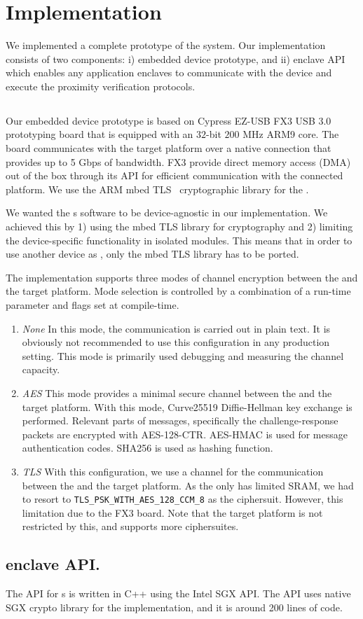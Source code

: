 \section{Implementation}
\label{sec:implementation}

We implemented a complete prototype of the \name system. Our implementation consists of two components: i) \device embedded device prototype, and ii) \name enclave API which enables any application enclaves to communicate with the \device device and execute the proximity verification protocols.


\subsection{\device} 

Our embedded device prototype is based on Cypress EZ-USB FX3 USB 3.0 prototyping board that is equipped with an $32$-bit $200$ MHz ARM9 core. The board communicates with the target platform over a native  connection that provides up to 5 Gbps of bandwidth. FX3 provide direct memory access (DMA) out of the box through its API for efficient communication with the connected platform. We use the ARM mbed TLS~\cite{mbed} cryptographic library for the \tls.

 We wanted the \device{}s software to be device-agnostic in our implementation. We achieved this by 1) using the mbed TLS library for cryptography and 2) limiting the device-specific functionality in isolated modules. This means that in order to use another device as \device, only the mbed TLS library has to be ported.

 The implementation supports three modes of channel encryption between the \device and the target platform. Mode selection is controlled by a combination of a run-time parameter and flags set at compile-time.

\begin{enumerate}
  \item \emph{None} In this mode, the communication is carried out in plain text. It is obviously not recommended to use this configuration in any production setting. This mode is primarily used debugging and measuring the channel capacity.
  \item \emph{AES} This mode provides a minimal secure channel between the \device and the target platform. With this mode, Curve25519 Diffie-Hellman key exchange is performed. Relevant parts of messages, specifically the challenge-response packets are encrypted with AES-128-CTR. AES-HMAC is used for message authentication codes. SHA256 is used as hashing function.
  \item \emph{TLS} With this configuration, we use a \tls channel for the communication between the \device and the target platform. As the \device only has limited SRAM, we had to resort to \texttt{TLS\_PSK\_WITH\_AES\_128\_CCM\_8} as the ciphersuit. However, this limitation due to the FX3 board. Note that the target platform is not restricted by this, and supports more ciphersuites. 
\end{enumerate}



\subsection{\name enclave API.} 
The \name API for \app{}s is written in C++ using the Intel SGX API. The API uses native SGX crypto library for the \tls implementation, and it is around 200 lines of code.